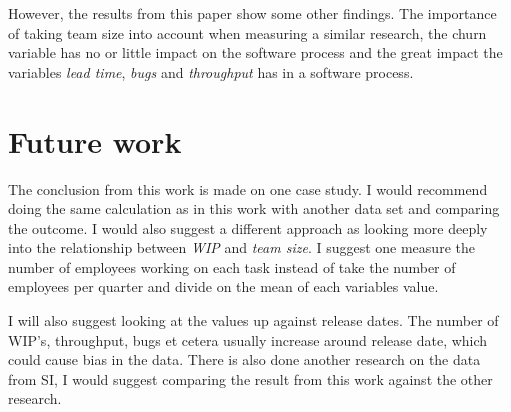 \documentclass[UKenglish]{ifimaster}  %
\begin{document}
However, the results from this paper show some other findings. The importance of taking team size into account when measuring a similar research, the churn variable has no or little impact on the software process and the great impact the variables \textit{lead time}, \textit{bugs} and \textit{throughput} has in a software process. 

\section{Future work}
The conclusion from this work is made on one case study. I would recommend doing the same calculation as in this work with another data set and comparing the outcome. I would also suggest a different approach as looking more deeply into the relationship between \textit{WIP} and  \textit{team size}. I suggest one measure the number of employees working on each task instead of take the number of employees per quarter and divide on the mean of each variables value.

I will also suggest looking at the values up against release dates. The number of WIP's, throughput, bugs et cetera usually increase around release date, which could cause bias in the data. There is also done another research on the data from SI, I would suggest comparing the result from this work against the other research.
\end{document}
